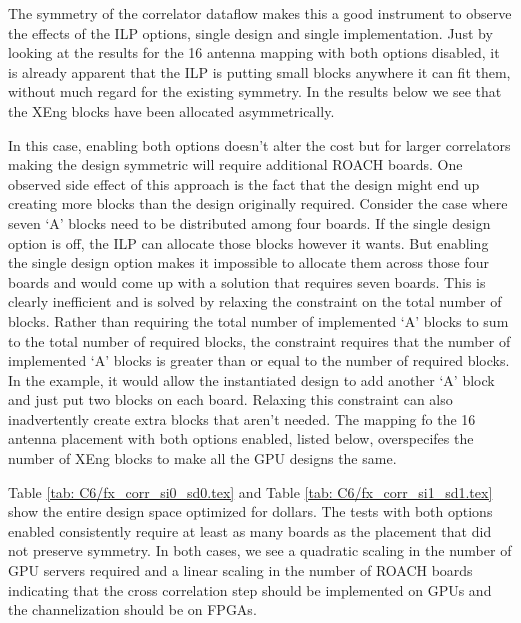 The symmetry of the correlator dataflow makes this a good instrument to observe the effects of the ILP options, single design and single implementation.
Just by looking at the results for the 16 antenna mapping with both options disabled, it is already apparent that the ILP is putting small blocks anywhere it can fit them, without much regard for the existing symmetry.
In the results below we see that the XEng blocks have been allocated asymmetrically.


  
In this case, enabling both options doesn't alter the cost but for larger correlators making the design symmetric will require additional ROACH boards.
One observed side effect of this approach is the fact that the design might end up creating more blocks than the design originally required.
Consider the case where seven `A' blocks need to be distributed among four boards. 
If the single design option is off, the ILP can allocate those blocks however it wants.
But enabling the single design option makes it impossible to allocate them across those four boards and would come up with a solution that requires seven boards.
This is clearly inefficient and is solved by relaxing the constraint on the total number of blocks.
Rather than requiring the total number of implemented `A' blocks to sum to the total number of required blocks, the constraint requires that the number of implemented `A' blocks is greater than or equal to the number of required blocks.
In the example, it would allow the instantiated design to add another `A' block and just put two blocks on each board.
Relaxing this constraint can also inadvertently create extra blocks that aren't needed.
The mapping fo the 16 antenna placement with both options enabled, listed below, overspecifes the number of XEng blocks to make all the GPU designs the same.
  
  
  
Table \ref{tab: C6/fx_corr_si0_sd0.tex} and Table \ref{tab: C6/fx_corr_si1_sd1.tex} show the entire design space optimized for dollars.
The tests with both options enabled consistently require at least as many boards as the placement that did not preserve symmetry.
In both cases, we see a quadratic scaling in the number of GPU servers required and a linear scaling in the number of ROACH boards indicating that the cross correlation step should be implemented on GPUs and the channelization should be on FPGAs.

